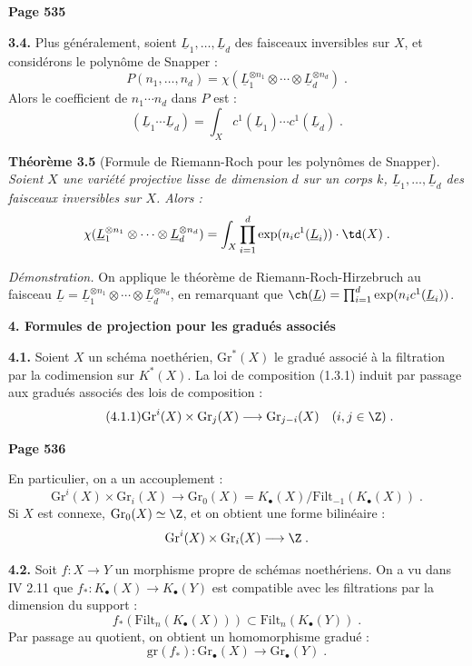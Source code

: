 \newpage
\noindent\textbf{Page 535}

\smallskip
\noindent\textbf{3.4.} Plus g\'en\'eralement, soient $\underline{L}_1, \ldots, \underline{L}_d$ des faisceaux inversibles sur $X$, et consid\'erons le polyn\^ome de Snapper :
\[
P(n_1, \ldots, n_d) = \chi(\underline{L}_1^{\otimes n_1} \otimes \cdots \otimes \underline{L}_d^{\otimes n_d})\;.
\]
Alors le coefficient de $n_1 \cdots n_d$ dans $P$ est :
\[
(\underline{L}_1 \cdots \underline{L}_d) = \int_X c^1(\underline{L}_1) \cdots c^1(\underline{L}_d)\;.
\]

\smallskip
\noindent\textbf{Th\'eor\`eme 3.5} (Formule de Riemann-Roch pour les polyn\^omes de Snapper). \textit{Soient $X$ une vari\'et\'e projective lisse de dimension $d$ sur un corps $k$, $\underline{L}_1, \ldots, \underline{L}_d$ des faisceaux inversibles sur $X$. Alors :
\[
\chi(\underline{L}_1^{\otimes n_1} \otimes \cdots \otimes \underline{L}_d^{\otimes n_d}) = \int_X \prod_{i=1}^d \exp(n_i c^1(\underline{L}_i)) \cdot \td(X)\;.
\]}

\textit{D\'emonstration.} On applique le th\'eor\`eme de Riemann-Roch-Hirzebruch au faisceau $\underline{L} = \underline{L}_1^{\otimes n_1} \otimes \cdots \otimes \underline{L}_d^{\otimes n_d}$, en remarquant que $\ch(\underline{L}) = \prod_{i=1}^d \exp(n_i c^1(\underline{L}_i))$.

\medskip
\noindent\textbf{4. Formules de projection pour les gradu\'es associ\'es}

\smallskip
\noindent\textbf{4.1.} Soient $X$ un sch\'ema noeth\'erien, $\mathrm{Gr}^*(X)$ le gradu\'e associ\'e \`a la filtration par la codimension sur $K^*(X)$. La loi de composition (1.3.1) induit par passage aux gradu\'es associ\'es des lois de composition :
\begin{equation}\tag{4.1.1}
\mathrm{Gr}^i(X) \times \mathrm{Gr}_j(X) \longrightarrow \mathrm{Gr}_{j-i}(X) \quad (i, j \in \Z)\;.
\end{equation}

\newpage
\noindent\textbf{Page 536}

En particulier, on a un accouplement :
\[
\mathrm{Gr}^i(X) \times \mathrm{Gr}_i(X) \longrightarrow \mathrm{Gr}_0(X) = K_\bullet(X)/\mathrm{Filt}_{-1}(K_\bullet(X))\;.
\]
Si $X$ est connexe, $\mathrm{Gr}_0(X) \simeq \Z$, et on obtient une forme bilin\'eaire :
\[
\mathrm{Gr}^i(X) \times \mathrm{Gr}_i(X) \longrightarrow \Z\;.
\]

\smallskip
\noindent\textbf{4.2.} Soit $f : X \longrightarrow Y$ un morphisme propre de sch\'emas noeth\'eriens. On a vu dans IV 2.11 que $f_* : K_\bullet(X) \longrightarrow K_\bullet(Y)$ est compatible avec les filtrations par la dimension du support :
\[
f_*(\mathrm{Filt}_n(K_\bullet(X))) \subset \mathrm{Filt}_n(K_\bullet(Y))\;.
\]
Par passage au quotient, on obtient un homomorphisme gradu\'e :
\[
\mathrm{gr}(f_*) : \mathrm{Gr}_\bullet(X) \longrightarrow \mathrm{Gr}_\bullet(Y)\;.
\]

